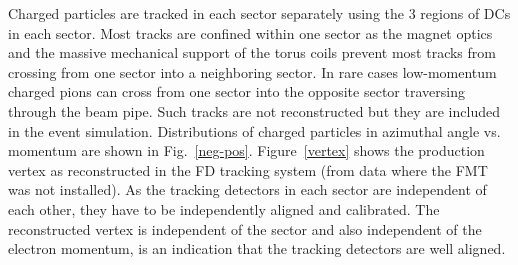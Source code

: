 \documentclass[final,3p,twocolumn]{elsarticle}
\begin{document}
Charged particles are tracked in each sector separately using the 3 regions of DCs in each sector. Most tracks
are confined within one sector as the magnet optics and the massive mechanical support of the torus coils prevent
most tracks from crossing from one sector into a neighboring sector. In rare cases low-momentum charged pions
can cross from one sector into the opposite sector traversing through the beam pipe. Such tracks are not
reconstructed but they are included in the event simulation. Distributions of charged particles in azimuthal angle
vs. momentum are shown in Fig.~\ref{neg-pos}. Figure~\ref{vertex} shows the production vertex as
reconstructed in the FD tracking system (from data where the FMT was not installed). As the tracking detectors in each sector 
are independent of each other, they have to be independently aligned and calibrated. The reconstructed 
vertex is independent of the sector and also independent of the electron momentum, is an indication that the 
tracking detectors are well aligned.  
\end{document}
